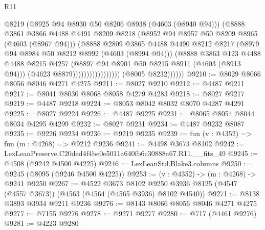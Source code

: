 \begin{lexlean}{R11}
\begin{coremodule}
                                        @8219
                                        (@8925 @94 @8930 @50 @8206 @8938 (@4603 (@8940 @94)))
                                        (@8888
                                          @3861
                                          @3866
                                          @4488
                                          @4491
                                          @8209
                                          @8218
                                          (@8952 @94 @8957 @50 @8209 @8965 (@4603 (@8967 @94)))
                                          (@8888
                                            @2809
                                            @3865
                                            @4488
                                            @4490
                                            @8212
                                            @8217
                                            (@8979 @94 @8984 @50 @8212 @8992 (@4603 (@8994 @94)))
                                            (@8888
                                              @3863
                                              @123
                                              @4488
                                              @4488
                                              @8215
                                              @4257
                                              (@8897 @94 @8901 @50 @8215 @8911 (@4603 (@8913 @94)))
                                              (@4623 @8879)))))))))))))))))
              (@8005 @8232))))))
@9210 := @8029 @8066 @8056 @8046 @4271 @4275
@9211 := @8027 @9210
@9212 := @4487 @9211
@9217 := @8041 @8030 @8068 @8058 @4279 @4283
@9218 := @8027 @9217
@9219 := @4487 @9218
@9224 := @8053 @8042 @8032 @8070 @4287 @4291
@9225 := @8027 @9224
@9226 := @4487 @9225
@9231 := @8065 @8054 @8044 @8034 @4295 @4299
@9232 := @8027 @9231
@9234 := @4487 @9232 @8087
@9235 := @9226 @9234
@9236 := @9219 @9235
@9239 := fun (v : @4352) => fun (m : @4268) => @9212 @9236
@9241 := @4498 @3673 @8102
@9242 := LexLeanPreserve.C20ded4f4be0e5011a640fb6c30888a67.R11.__fits_49
@9245 := @4508 (@9242 @4500 @4225)
@9246 := LexLeanStd.Blake3.columns
@9250 := @9245 (@8095 (@9246 @4500 @4225))
@9253 := (v : @4352) -> (m : @4268) -> @9241 @9250
@9267 := @4522
    @3673
    @8102
    @9250
    @3936
    @8125
    (@4547 (@4557 @3673))
    (@4563 (@4564 (@4565 @3936) @8102 @4540))
@9271 := @8138 @3893 @3934 @9211 @9236
@9276 := @8143 @8066 @8056 @8046 @4271 @4275
@9277 := @7155 @9276
@9278 := @9271 @9277
@9280 := @717 (@4461 @9276)
@9281 := @4223 @9280

\end{coremodule}
\end{lexlean}
